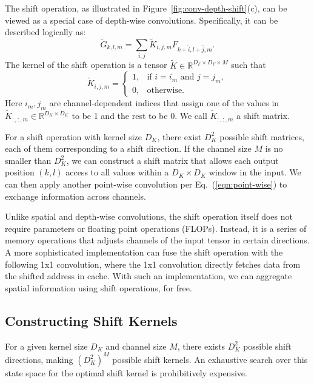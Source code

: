 \documentclass[10pt,twocolumn,letterpaper]{article}
\begin{document}
The shift operation, as illustrated in Figure~\ref{fig:conv-depth-shift}(c), can be viewed as a special case of depth-wise convolutions. Specifically, it can be described logically as:
\begin{equation}
    \tilde{G}_{k, l, m} = \sum_{i, j}\tilde{K}_{i, j, m} F_{k+\hat{i},l+\hat{j}, m}.
    \label{eqn:shift}
\end{equation}
The kernel of the shift operation is a tensor $\tilde{K} \in \mathbb{R}^{D_F \times D_F\times M}$ such that 
\begin{equation}
    \tilde{K}_{i, j, m} = 
    \begin{cases}
        1, & \text{if } i=i_m \text{ and } j=j_m,  \\
        0, & \text{otherwise}.
    \end{cases}
\end{equation}
Here $i_m, j_m$ are channel-dependent indices that assign one of the values in $\tilde{K}_{:, :, m} \in \mathbb{R}^{D_K\times D_K}$ to be 1 and the rest to be 0. We call $\tilde{K}_{:, :, m}$ a shift matrix. 

For a shift operation with kernel size $D_K$, there exist $D_K^2$ possible shift matrices, each of them corresponding to a shift direction. If the channel size $M$ is no smaller than $D_K^2$, we can construct a shift matrix that allows each output position $(k, l)$ access to all values within a $D_K \times D_K$ window in the input. We can then apply another point-wise convolution per Eq.~(\ref{eqn:point-wise}) to exchange information across channels. 

Unlike spatial and depth-wise convolutions, the shift operation itself does not require parameters or floating point operations (FLOPs). Instead, it is a series of memory operations that adjusts channels of the input tensor in certain directions. A more sophisticated implementation can fuse the shift operation with the following 1x1 convolution, where the 1x1 convolution directly fetches data from the shifted address in cache. With such an implementation, we can aggregate spatial information using shift operations, for free.


\subsection{Constructing Shift Kernels}

For a given kernel size $D_K$ and channel size $M$, there exists $D_K^2$ possible shift directions, making $(D_K^2)^M$ possible shift kernels. An exhaustive search over this state space for the optimal shift kernel is prohibitively expensive. 
\end{document}
